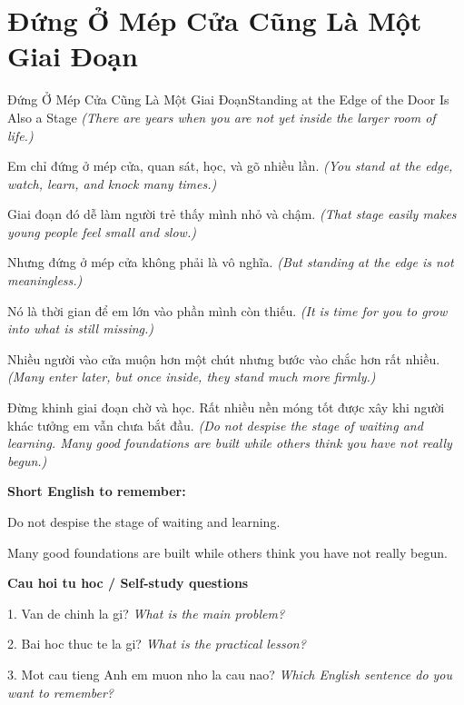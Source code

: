\section{Đứng Ở Mép Cửa Cũng Là Một Giai Đoạn}
\begin{truyen}{Đứng Ở Mép Cửa Cũng Là Một Giai Đoạn}{Standing at the Edge of the Door Is Also a Stage}
\textit{(There are years when you are not yet inside the larger room of life.)}

Em chỉ đứng ở mép cửa, quan sát, học, và gõ nhiều lần.
\textit{(You stand at the edge, watch, learn, and knock many times.)}

Giai đoạn đó dễ làm người trẻ thấy mình nhỏ và chậm.
\textit{(That stage easily makes young people feel small and slow.)}

Nhưng đứng ở mép cửa không phải là vô nghĩa.
\textit{(But standing at the edge is not meaningless.)}

Nó là thời gian để em lớn vào phần mình còn thiếu.
\textit{(It is time for you to grow into what is still missing.)}

Nhiều người vào cửa muộn hơn một chút nhưng bước vào chắc hơn rất nhiều.
\textit{(Many enter later, but once inside, they stand much more firmly.)}

\end{truyen}

\begin{baihoc}
Đừng khinh giai đoạn chờ và học. Rất nhiều nền móng tốt được xây khi người khác tưởng em vẫn chưa bắt đầu.
\textit{(Do not despise the stage of waiting and learning. Many good foundations are built while others think you have not really begun.)}
\end{baihoc}

\begin{ghinhoanh}
\textbf{Short English to remember:}

Do not despise the stage of waiting and learning.

Many good foundations are built while others think you have not really begun.

\end{ghinhoanh}

\begin{tuhocnhanh}
\textbf{Cau hoi tu hoc / Self-study questions}

1. Van de chinh la gi? \textit{What is the main problem?}

2. Bai hoc thuc te la gi? \textit{What is the practical lesson?}

3. Mot cau tieng Anh em muon nho la cau nao? \textit{Which English sentence do you want to remember?}
\end{tuhocnhanh}
\ngancach

